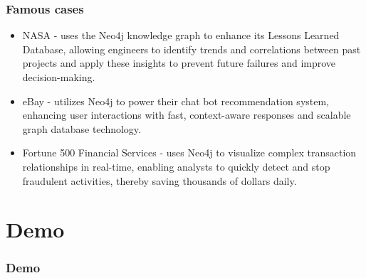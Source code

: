 \documentclass[aspectratio=169]{beamer}
\begin{document}
\begin{frame}
    \frametitle{Famous cases}
	\begin{itemize}
		\item NASA - uses the Neo4j knowledge graph to enhance its Lessons Learned Database, allowing engineers to identify trends and correlations between past projects and apply these insights to prevent future failures and improve decision-making.
		\item eBay - utilizes Neo4j to power their chat bot recommendation system, enhancing user interactions with fast, context-aware responses and scalable graph database technology.
		\item Fortune 500 Financial Services - uses Neo4j to visualize complex transaction relationships in real-time, enabling analysts to quickly detect and stop fraudulent activities, thereby saving thousands of dollars daily.
	\end{itemize}
\end{frame}

\section{Demo}

\begin{frame}
    \frametitle{Demo}
\end{frame}
\end{document}
